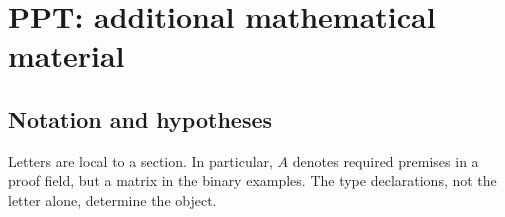 \documentclass[11pt,oneside,openany]{book}
\numberwithin{equation}{section}
\begin{document}
\chapter{PPT: additional mathematical material}
\setcounter{section}{0}

\section{Notation and hypotheses}
\label{PPT:app:notation}

Letters are local to a section. In particular, $A$ denotes required premises in a proof field, but a matrix in the binary examples. The type declarations, not the letter alone, determine the object.
\end{document}
